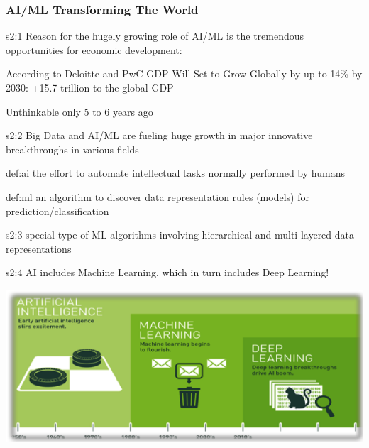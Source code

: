 \documentclass{tron}
\begin{document}
\subsubsection{AI/ML Transforming The World}
\vspace{5pt}
\begin{remark}[Why]{s2:1}
	Reason for the hugely growing role of AI/ML is the tremendous opportunities for economic development:

	According to Deloitte and PwC GDP Will Set to Grow Globally by up to 14\% by 2030: +15.7 trillion to the global GDP

	Unthinkable only 5 to 6 years ago
\end{remark}
\begin{remark}[How]{s2:2}
	Big Data and AI/ML are fueling huge growth in major innovative breakthroughs in various fields
\end{remark}
\begin{definition}[\Gls{AI}]{def:ai}
	the effort to automate intellectual tasks normally performed by humans
\end{definition}
\begin{definition}[\Gls{ML}]{def:ml}
	an algorithm to discover data representation rules (models) for prediction/classification
\end{definition}
\begin{definition}{s2:3}
	special type of ML algorithms involving hierarchical and multi-layered data representations
\end{definition}

\begin{alert}[NOTE]{s2:4}
	AI includes Machine Learning, which in turn includes Deep Learning!\\
	\begin{center}
		\includegraphics[width=0.8\columnwidth]{Figs/Slide2/ml ai dl.png}		
	\end{center}
\end{alert}

%
\end{document}
